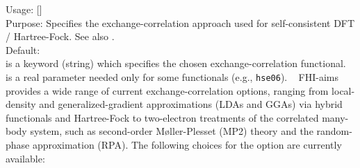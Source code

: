{
 \noindent
 Usage:   [] \\[1.0ex]
 Purpose: Specifies the exchange-correlation approach used for self-consistent
 DFT / Hartree-Fock. See also . \\[1.0ex]
 Default:  \\[1.0ex]
  is a keyword (string) which specifies the chosen
    exchange-correlation functional. \\
  is a real parameter needed only for some functionals
 (e.g., \texttt{hse06}). \
}
FHI-aims provides a wide range of current exchange-correlation options,
ranging from local-density and generalized-gradient approximations (LDAs and
GGAs) via hybrid functionals and Hartree-Fock to two-electron
treatments of the correlated many-body system, such as second-order
M{\o}ller-Plesset (MP2) theory and the random-phase approximation (RPA). The
following choices for the \option{xc-type} option are currently available:
